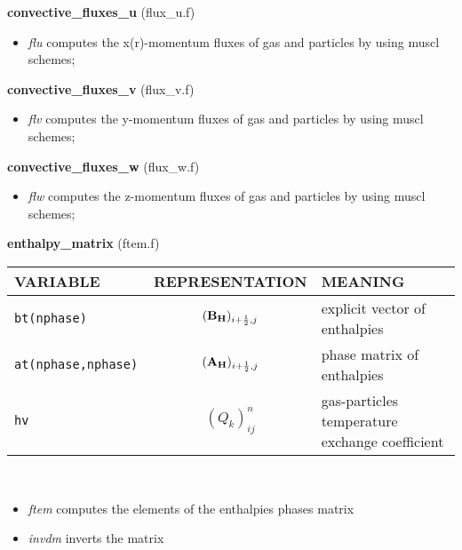 %
%
{\large{\bf convective\_fluxes\_u}} (flux\_u.f)\\
\begin{itemize}
\item {\em flu} computes the x(r)-momentum fluxes of gas and particles by using muscl schemes;\\
\end{itemize}
%
%
{\large{\bf convective\_fluxes\_v}} (flux\_v.f)\\
\begin{itemize}
\item {\em flv} computes the y-momentum fluxes of gas and particles by using muscl schemes;\\
\end{itemize}
%
%
{\large{\bf convective\_fluxes\_w}} (flux\_w.f)\\
\begin{itemize}
\item {\em flw} computes the z-momentum fluxes of gas and particles by using muscl schemes;\\
\end{itemize}
%
%
{\large{\bf enthalpy\_matrix}} (ftem.f)\\[5mm]
\begin{tabular}{|p{6cm}|c|p{6cm}|}\hline
VARIABLE & REPRESENTATION & MEANING\\\hline
\tt bt(nphase)  & $({\bf B_H})_{i+\frac{1}{2},j}$ & explicit vector 
of enthalpies \\ \hline
\tt at(nphase,nphase) & $({\bf A_H})_{i+\frac{1}{2},j}$ & phase matrix of enthalpies\\\hline
\tt hv               & $(Q_k)_{ij}^n$ & gas-particles temperature exchange coefficient\\\hline
\end{tabular}\\
\begin{itemize}
\item{\em ftem} computes the elements of the enthalpies phases matrix\\
\item{\em invdm} inverts the matrix\\
\end{itemize}
